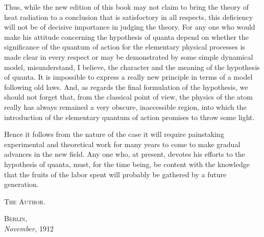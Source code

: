\documentclass[12pt,oneside]{book}
\begin{document}
Thus, while the new edition of this book may not claim to bring the theory of heat radiation to a conclusion that is satisfoctory in all respects, this deficiency will not be of decisive importance in judging the theory. For any one who would make his attitude concerning the hypothesis of quanta depend on whether the significance of the quantum of action for the elementary physical processes is made clear in every respect or may be demonstrated by some simple dynamical model, misunderstand, I believe, the character and the meaning of the hypothesis of quanta. It is impossible to express a really new principle in terms of a model following old laws. And, as regards the final formulation of the hypothesis, we should not forget that, from the classical point of view, the physics of the atom really has always remained a very obscure, inaccessible region, into which the introduction of the elementary quantum of action promises to throw some light. \par

Hence it follows from the nature of the case it will require painstaking experimental and theoretical work for many years to come to make gradual advances in the new field. Any one who, at present, devotes his efforts to the hypothesis of quanta, must, for the time being, be content with the knowledge that the fruits of the labor spent will probably be gathered by a future generation. \par

\begin{flushright}
    \textsc{The Author.}
\end{flushright} \par
\textsc{Berlin,} \\
\textit{November,} 1912
\end{document}
